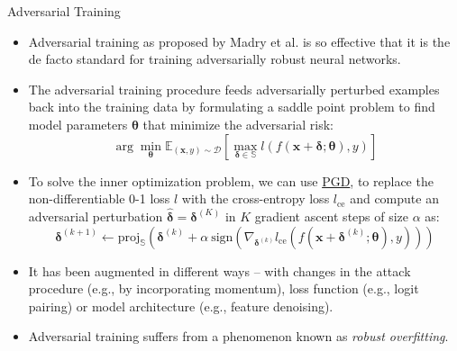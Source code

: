 \begin{frame}{Adversarial Training}
    \begin{itemize}[<+-| alert@+>] %
        \item Adversarial training as proposed by Madry et al. is so effective that it is the de facto standard for training adversarially robust neural networks.
        \item The adversarial training procedure feeds adversarially perturbed examples back into the training data by formulating a saddle point problem to find model parameters $\mathbf{\theta}$ that minimize the adversarial risk:
            $$\arg \min_\mathbf{\theta} \mathbb{E}_{(\mathbf{x},y)\sim \mathcal{D}}\left[\max_{\mathbf{\delta} \in \mathbb{S}} l(f(\mathbf{x}+\mathbf{\delta} ; \mathbf{\theta}), y)\right]$$
        \item To solve the inner optimization problem, we can use \href{https://arxiv.org/pdf/1706.06083}{PGD}, to replace the non-differentiable 0-1 loss $l$ with the cross-entropy loss $l_\text{ce}$ and compute an adversarial perturbation $\hat{\mathbf{\delta}}=\mathbf{\delta}^{(K)}$ in $K$ gradient ascent steps of size $\alpha$ as:
            $$\mathbf{\delta}^{(k+1)} \leftarrow \text{proj}_{\mathbb{S}}\left(\mathbf{\delta}^{(k)} + \alpha ~\text{sign}\left(\nabla_{\mathbf{\delta}^{(k)}}l_{\text{ce}}(f(\mathbf{x}+\mathbf{\delta}^{(k)};\mathbf{\theta}),y)\right)\right)$$
        \item It has been augmented in different ways – with changes in the attack procedure (e.g., by incorporating momentum), loss function (e.g., logit pairing) or model architecture (e.g., feature denoising).
        \item Adversarial training suffers from a phenomenon known as \emph{robust overfitting}.
    \end{itemize}
\end{frame}

